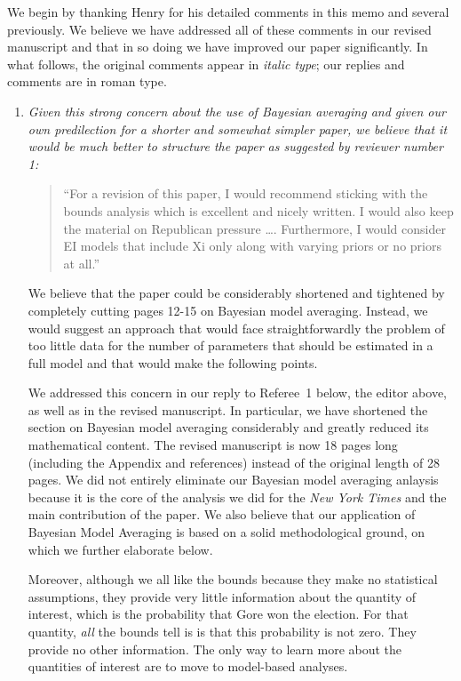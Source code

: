\documentclass[11pt]{article}
\begin{document}
We begin by thanking Henry for his detailed comments in this memo and
several previously.  We believe we have addressed all of these
comments in our revised manuscript and that in so doing we have
improved our paper significantly.  In what follows, the original
comments appear in \emph{italic type}; our replies and comments are in
roman type.

\bigskip
{}

\begin{enumerate}
  
\item {\it Given this strong concern about the use of Bayesian
    averaging and given our own predilection for a shorter and
    somewhat simpler paper, we believe that it would be much better to
    structure the paper as suggested by reviewer number 1:
    \begin{quote}
      ``For a revision of this paper, I would recommend sticking with
      the bounds analysis which is excellent and nicely written.  I
      would also keep the material on Republican pressure \ldots.
      Furthermore, I would consider EI models that include Xi only along
      with varying priors or no priors at all.''
    \end{quote}
    We believe that the paper could be considerably shortened and
    tightened by completely cutting pages 12-15 on Bayesian model
    averaging.  Instead, we would suggest an approach that would face
    straightforwardly the problem of too little data for the number of
    parameters that should be estimated in a full model and that would
    make the following points.}
  
  We addressed this concern in our reply to Referee~1 below, the
  editor above, as well as in the revised manuscript.  In particular,
  we have shortened the section on Bayesian model averaging
  considerably and greatly reduced its mathematical content.  The
  revised manuscript is now 18 pages long (including the Appendix and
  references) instead of the original length of 28 pages. We did not
  entirely eliminate our Bayesian model averaging anlaysis because it
  is the core of the analysis we did for the {\it New York Times} and
  the main contribution of the paper.  We also believe that our
  application of Bayesian Model Averaging is based on a solid
  methodological ground, on which we further elaborate below.
  
  Moreover, although we all like the bounds because they make no
  statistical assumptions, they provide very little information about
  the quantity of interest, which is the probability that Gore won the
  election.  For that quantity, \emph{all} the bounds tell is is that
  this probability is not zero.  They provide no other information.
  The only way to learn more about the quantities of interest are to
  move to model-based analyses.
  

\end{enumerate}
\end{document}
